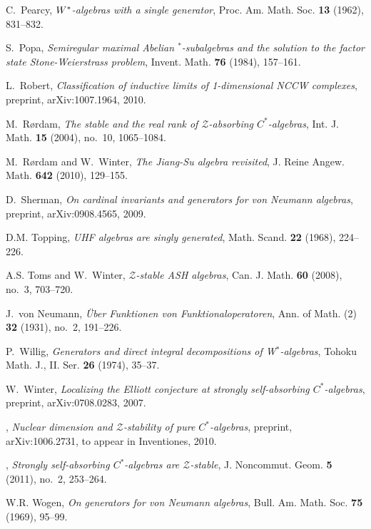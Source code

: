 \documentclass{amsart}
\theoremstyle{definition}
\begin{document}
\begin{thebibliography}{DHTW09}
C.~Pearcy, \emph{{$W\sp *$-algebras with a single generator}}, Proc. Am. Math.
  Soc. \textbf{13} (1962), 831--832.

S.~Popa, \emph{{Semiregular maximal Abelian $^{*}$-subalgebras and the solution
  to the factor state Stone-Weierstrass problem}}, Invent. Math. \textbf{76}
  (1984), 157--161.

L.~Robert, \emph{{Classification of inductive limits of 1-dimensional NCCW
  complexes}}, preprint, arXiv:1007.1964, 2010.

M.~R{\o}rdam, \emph{{The stable and the real rank of $\mathcal{Z}$-absorbing
  {{$C^*$-al\-ge\-bra}}{s}}}, Int. J. Math. \textbf{15} (2004), no.~10, 1065--1084.

M.~R{\o}rdam and W.~Winter, \emph{{The Jiang-Su algebra revisited}}, J. Reine
  Angew. Math. \textbf{642} (2010), 129--155.

D.~Sherman, \emph{{On cardinal invariants and generators for von Neumann
  algebras}}, preprint, arXiv:0908.4565, 2009.

D.M. Topping, \emph{{UHF algebras are singly generated}}, Math. Scand.
  \textbf{22} (1968), 224--226.

A.S. Toms and W.~Winter, \emph{{$\mathcal{Z}$-stable ASH algebras}}, Can. J.
  Math. \textbf{60} (2008), no.~3, 703--720.

J.~von Neumann, \emph{{\"Uber Funktionen von Funktionaloperatoren}}, Ann. of
  Math. (2) \textbf{32} (1931), no.~2, 191--226.

P.~Willig, \emph{{Generators and direct integral decompositions of
  W$^*$-algebras}}, Tohoku Math. J., II. Ser. \textbf{26} (1974), 35--37.

W.~Winter, \emph{{Localizing the Elliott conjecture at strongly self-absorbing
  {{$C^*$-al\-ge\-bra}}{s}}}, preprint, arXiv:0708.0283, 2007.

\bysame, \emph{{Nuclear dimension and $\mathcal{Z}$-stability of pure {{$C^*$-al\-ge\-bra}}{s}}},
  preprint, arXiv:1006.2731, to appear in Inventiones, 2010.

\bysame, \emph{{Strongly self-absorbing {{$C^*$-al\-ge\-bra}}{s} are $\mathcal{Z}$-stable}}, J.
  Noncommut. Geom. \textbf{5} (2011), no.~2, 253--264.

W.R. Wogen, \emph{{On generators for von Neumann algebras}}, Bull. Am. Math.
  Soc. \textbf{75} (1969), 95--99.

\end{thebibliography}
\end{document}

